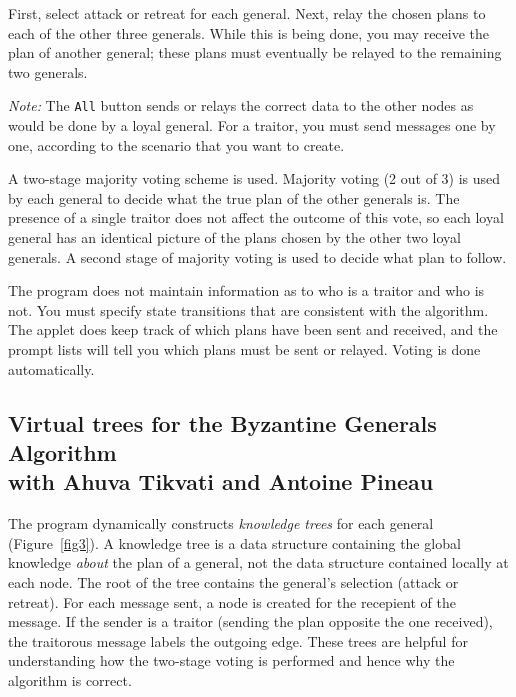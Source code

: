 \documentclass[11pt]{article}
\newcommand{\p}[1]{\texttt{#1}}
\begin{document}
First, select attack or retreat for each general. Next, relay the
chosen plans to each of the other three generals. While this is
being done, you may receive the plan of another general; these
plans must eventually be relayed to the remaining two generals.

\emph{Note:} The \p{All} button sends or relays the correct data
to the other nodes as would be done by a loyal general. For a
traitor, you must send messages one by one, according to the
scenario that you want to create.

A two-stage majority voting scheme is used. Majority voting (2
out of 3) is used by each general to decide what the true plan
of the other generals is. The presence of a single traitor does
not affect the outcome of this vote, so each loyal general has
an identical picture of the plans chosen by the other two loyal
generals. A second stage of majority voting is used to decide
what plan to follow.

The program does not maintain information as to who is a traitor
and who is not. You must specify state transitions that are
consistent with the algorithm. The applet does keep track of
which plans have been sent and received, and the prompt lists
will tell you which plans must be sent or relayed. Voting is
done automatically.

\subsection{Virtual trees for the Byzantine Generals Algorithm\\
with Ahuva Tikvati and Antoine Pineau}

The program dynamically constructs \emph{knowledge trees} for each general (Figure~\ref{fig3}).
A knowledge tree is a data structure
containing the global knowledge \emph{about} the plan of a
general, not the data structure contained locally at each node.
The root of the tree contains the general's selection (attack or
retreat). For each message sent, a node is created for the
recepient of the message. If the sender is a traitor (sending
the plan opposite the one received), the traitorous message
labels the outgoing edge. These trees are helpful for
understanding how the two-stage voting is performed and hence
why the algorithm is correct.
\end{document}
